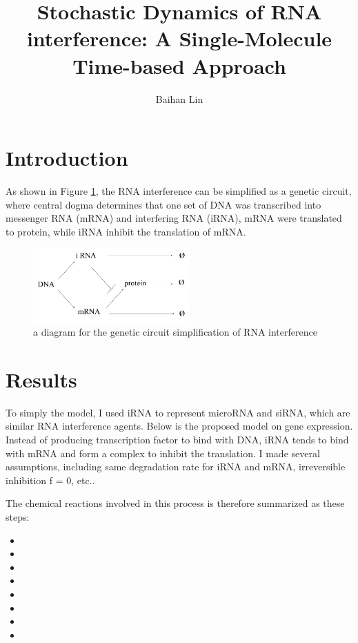 \documentclass[fleqn,10pt]{wlscirep}
\title{Stochastic Dynamics of RNA interference: A Single-Molecule Time-based Approach}
\author[1*]{Baihan Lin}
\affil[1]{Department of Applied Mathematics, University of Washington, Seattle, WA 98195, USA}
\affil[*]{doerlbh@gmail.com}
\begin{document}
\flushbottom
\maketitle

\section*{Introduction}

\cite{Figueredo:2009dg} 

As shown in Figure \ref{fig:diagram}, the RNA interference can be simplified as a genetic circuit, where central dogma determines that one set of DNA was transcribed into messenger RNA (mRNA) and interfering RNA (iRNA), mRNA were translated to protein, while iRNA inhibit the translation of mRNA.

\begin{figure}[ht]
\centering
\includegraphics[width=6cm]{diagram}
\caption{a diagram for the genetic circuit simplification of RNA interference}
\label{fig:diagram}
\end{figure}


\section*{Results}

To simply the model, I used iRNA to represent microRNA and siRNA, which are similar RNA interference agents. Below is the proposed model on gene expression. Instead of producing transcription factor to bind with DNA, iRNA tends to bind with mRNA and form a complex to inhibit the translation. I made several assumptions, including same degradation rate for iRNA and mRNA, irreversible inhibition f = 0, etc..
 
The chemical reactions involved in this process is therefore summarized as these      steps:

\begin{itemize}
\item {}
\item {}
\item {}
\item {}
\item {}
\item {}
\item {}
\item {}
\end{itemize}
 
\end{document}
